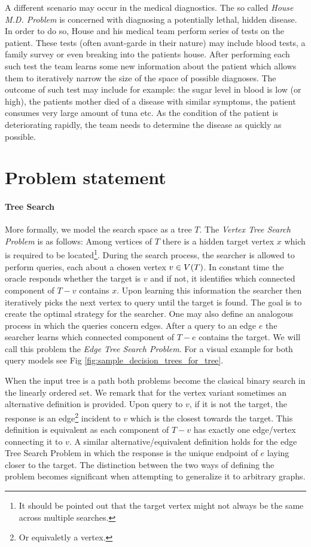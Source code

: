 A different scenario may occur in the medical diagnostics. The so called \textit{House M.D. Problem} is concerned with diagnosing a potentially lethal, hidden disease. In order to do so, House and his medical team perform series of tests on the patient. These tests (often avant-garde in their nature) may include blood tests, a family survey or even breaking into the patients house. After performing each such test the team learns some new information about the patient which allows them to iteratively narrow the size of the space of possible diagnoses. The outcome of such test may include for example: the sugar level in blood is low (or high), the patients mother died of a disease with similar symptoms, the patient consumes very large amount of tuna etc. As the condition of the patient is deteriorating rapidly, the team needs to determine the disease as quickly as possible. 

\section{Problem statement}
\paragraph{Tree Search}
More formally, we model the search space as a tree $T$. The \textit{Vertex Tree Search Problem} is as follows: Among vertices of $T$ there is a hidden target vertex $x$ which is required to be located\footnote{It should be pointed out that the target vertex might not always be the same across multiple searches.}. During the search process, the searcher is allowed to perform queries, each about a chosen vertex $v\in V\mathopen{}\left( T \right)$. In constant time the oracle responds whether the target is $v$ and if not, it identifies which connected component of $T-v$ contains $x$. Upon learning this information the searcher then iteratively picks the next vertex to query until the target is found. The goal is to create the optimal strategy for the searcher. 
One may also define an analogous process in which the queries concern edges. After a query to an edge $e$ the searcher learns which connected component of $T-e$ contains the target. We will call this problem the \textit{Edge Tree Search Problem}. For a visual example for both query models see Fig \ref{fig:sample_decision_trees_for_tree}.  


When the input tree is a path both problems become the clasical binary search in the linearly ordered set.
We remark that for the vertex variant sometimes an alternative definition is provided. Upon query to $v$, if it is not the target, the response is an edge\footnote{Or equivaletly a vertex.} incident to $v$ which is the closest towards the target. This definition is equivalent as each component of $T-v$ has exactly one edge/vertex connecting it to $v$. A similar alternative/equivalent definition holds for the edge Tree Search Problem in which the response is the unique endpoint of $e$ laying closer to the target. The distinction between the two ways of defining the problem becomes significant when attempting to generalize it to arbitrary graphs.


